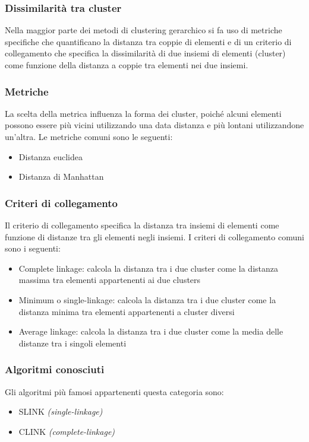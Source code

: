 	\subsubsection{Dissimilarità tra cluster}
		Nella maggior parte dei metodi di clustering gerarchico si fa uso di metriche specifiche che quantificano la distanza tra coppie di elementi e di un criterio di collegamento che specifica la dissimilarità di due insiemi di elementi (cluster) come funzione della distanza a coppie tra elementi nei due insiemi.

	\subsubsection{Metriche}
		La scelta della metrica influenza la forma dei cluster, poiché alcuni elementi possono essere più vicini utilizzando una data distanza e più lontani utilizzandone un'altra.
		Le metriche comuni sono le seguenti:
		\begin{itemize}
		  	\item Distanza euclidea
		  	\item Distanza di Manhattan
		\end{itemize}

	\subsubsection{Criteri di collegamento}
		Il criterio di collegamento specifica la distanza tra insiemi di elementi come funzione di distanze tra gli elementi negli insiemi.
		I criteri di collegamento comuni sono i seguenti:
		\begin{itemize}
			\item Complete linkage: calcola la distanza tra i due cluster come la distanza massima tra elementi appartenenti ai due clusters
			\item Minimum o single-linkage: calcola la distanza tra i due cluster come la distanza minima tra elementi appartenenti a cluster diversi
			\item Average linkage: calcola la distanza tra i due cluster come la media delle distanze tra i singoli elementi
		\end{itemize}

	\subsubsection{Algoritmi conosciuti}		
		Gli algoritmi più famosi appartenenti questa categoria sono:
		\begin{itemize}
			\item SLINK \emph{(single-linkage)}
		  	\item CLINK \emph{(complete-linkage)}
		\end{itemize}

